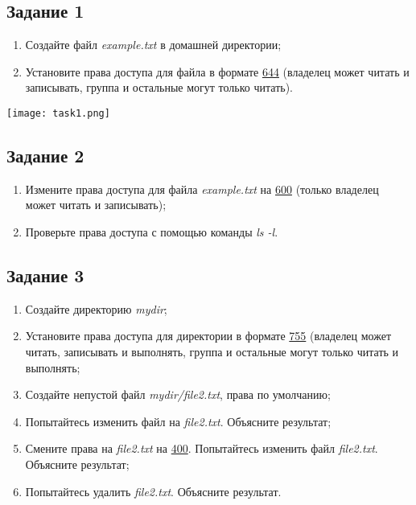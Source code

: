 \documentclass[12pt, a4paper]{report}
\begin{document}
	\subsection*{Задание 1}
	\begin{enumerate}
		\item Создайте файл \textit{example.txt} в домашней директории;
		\item Установите права доступа для файла в формате \underline{644} (владелец может читать и записывать, группа и остальные могут только читать).
	\end{enumerate}
	\lstset{style=mystyle}
	
	\begin{center}
		\texttt{[image: task1.png]}
	\end{center}

	\subsection*{Задание 2}
	\begin{enumerate}
		\item Измените права доступа для файла \textit{example.txt} на \underline{600} (только владелец может читать и записывать);
		\item Проверьте права доступа с помощью команды \textit{ls -l}.
	\end{enumerate}
	\lstset{style=mystyle}
	

	\subsection*{Задание 3}
	\begin{enumerate}
		\item Создайте директорию \textit{mydir};
		\item Установите права доступа для директории в формате \underline{755} (владелец может читать, записывать и выполнять, группа и остальные могут только читать и выполнять;
		\item Создайте непустой файл \textit{mydir/file2.txt}, права по умолчанию;
		\item Попытайтесь изменить файл на \textit{file2.txt}. Объясните результат;
		\item Смените права на \textit{file2.txt} на \underline{400}. Попытайтесь изменить файл \textit{file2.txt}. Объясните результат;
		\item Попытайтесь удалить \textit{file2.txt}. Объясните результат.
	\end{enumerate}
	\lstset{style=mystyle}
	
\end{document}
